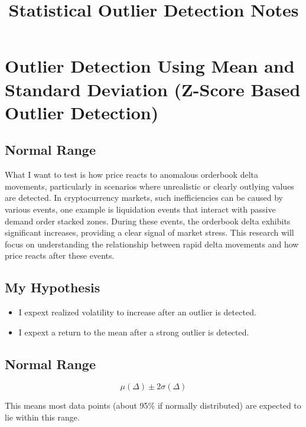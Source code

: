 \documentclass[12pt]{article}
\title{\Huge Statistical Outlier Detection Notes}
\author{}
\date{}
\begin{document}
\maketitle

\section*{Outlier Detection Using Mean and Standard Deviation (Z-Score Based Outlier Detection)}



\subsection*{Normal Range}

What I want to test is how price reacts to anomalous orderbook delta movements, particularly in scenarios where unrealistic or clearly outlying values are detected. In cryptocurrency markets, such inefficiencies can be caused by various events, one example is liquidation
 events that interact with passive demand order stacked zones. During these events, the orderbook delta exhibits significant increases, providing a clear signal of market stress. This research will focus on understanding the relationship between rapid delta movements and how price reacts after these events.

\subsection*{My Hypothesis}

\begin{itemize}
  \item I expext realized volatility to increase after an outlier is detected. 
  \item I expext a return to the mean after a strong outlier is detected.
\end{itemize}



\subsection*{Normal Range}





\[
\mu(\Delta) \pm 2\sigma(\Delta)
\]

This means most data points (about 95\% if normally distributed) are expected to lie within this range.

\newpage
\end{document}
